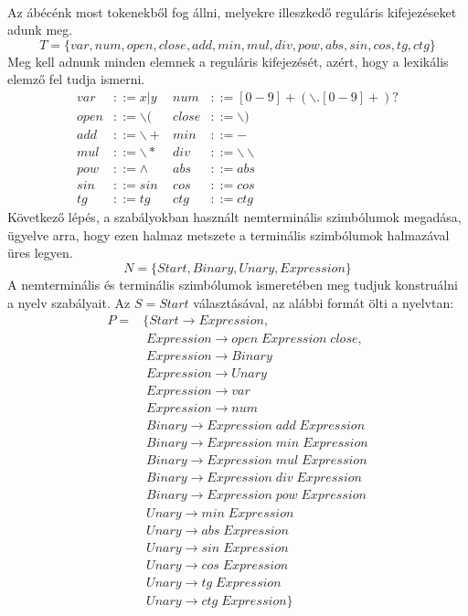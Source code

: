\documentclass{elteikthesis}
\begin{document}
\paragraph{}
Az ábécénk most tokenekből fog állni, melyekre illeszkedő reguláris kifejezéseket adunk meg.
$$T=\{var, num, open, close, add, min, mul, div, pow, abs, sin, cos, tg, ctg\}$$
Meg kell adnunk minden elemnek a reguláris kifejezését, azért, hogy a lexikális elemző fel tudja ismerni.
$$
\begin{array}{rlrl}
var & ::= x|y & num & ::= [0-9]+(\backslash.[0-9]+)? \\
open & ::= \backslash( & close & ::= \backslash)\\
add & ::= \backslash+ & min & ::= -\\
mul & ::= \backslash* & div & ::= \backslash\backslash\\
pow & ::= \wedge & abs & ::= abs\\
sin & ::= sin\ & cos & ::= cos\\
tg & ::= tg & ctg & ::= ctg
\end{array}
$$
Következő lépés, a szabályokban használt nemterminális szimbólumok megadása, ügyelve arra, hogy ezen halmaz metszete a terminális szimbólumok halmazával üres legyen.
$$N=\{Start, Binary, Unary, Expression\}$$
A nemterminális és terminális szimbólumok ismeretében meg tudjuk konstruálni a nyelv szabályait. Az $S=Start$ választásával, az alábbi formát ölti a nyelvtan:
$$
\begin{array}{rl}
P= & \{Start \rightarrow Expression, \\
&\; Expression \rightarrow open \; Expression \; close, \\
&\; Expression \rightarrow Binary \\
&\; Expression \rightarrow Unary \\
&\; Expression \rightarrow var \\
&\; Expression \rightarrow num \\
&\; Binary \rightarrow Expression \; add \; Expression \\
&\; Binary \rightarrow Expression \; min \; Expression \\
&\; Binary \rightarrow Expression \; mul \; Expression \\
&\; Binary \rightarrow Expression \; div \; Expression \\
&\; Binary \rightarrow Expression \; pow \; Expression \\
&\; Unary \rightarrow min \; Expression \\
&\; Unary \rightarrow abs \; Expression \\
&\; Unary \rightarrow sin \; Expression \\
&\; Unary \rightarrow cos \; Expression \\
&\; Unary \rightarrow tg \; Expression \\
&\; Unary \rightarrow ctg \; Expression\}
\end{array}
$$
\end{document}
